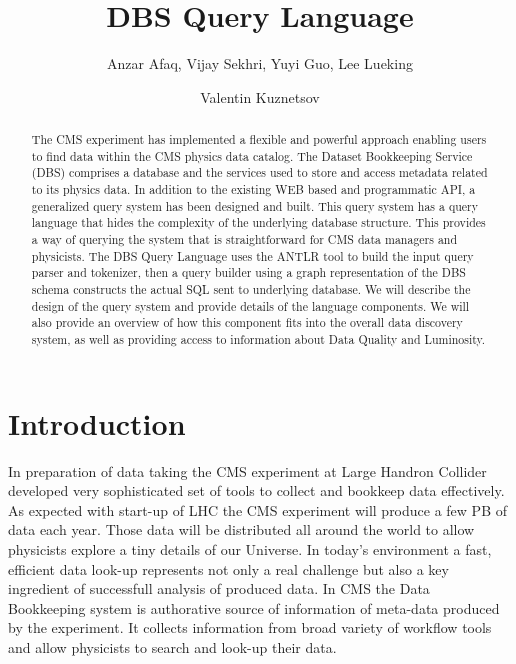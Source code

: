 \documentclass[a4paper]{jpconf}
\begin{document}
\title{DBS Query Language}

\author{Anzar Afaq, Vijay Sekhri, Yuyi Guo, Lee Lueking}
\address{Fermilab, Batavia, Illinois, USA}

\author{Valentin Kuznetsov}
\address{Cornell University, Ithaca, NY 14853, USA}

\begin{abstract}
The CMS experiment has implemented a flexible and 
powerful approach enabling users to find data within 
the CMS physics data catalog. The Dataset Bookkeeping 
Service (DBS) comprises a database and the services 
used to store and access metadata related to its physics 
data. In addition to the existing WEB based and programmatic 
API, a generalized query system has been designed and built. 
This query system has a query language that hides the 
complexity of the underlying database structure. This provides 
a way of querying the system that is straightforward for 
CMS data managers and physicists. The DBS Query Language 
uses the ANTLR tool to build the input query parser and tokenizer, 
then a query builder using a graph representation of the 
DBS schema constructs the actual SQL sent to underlying database. 
We will describe the design of the query system and provide 
details of the language components. We will also provide an 
overview of how this component fits into the overall data 
discovery system, as well as providing access to information 
about Data Quality and Luminosity.
\end{abstract}

\section{Introduction}
In preparation of data taking the CMS experiment at Large
Handron Collider developed very sophisticated set of tools
to collect and bookkeep data effectively. As expected with
start-up of LHC the CMS experiment will produce a few
PB of data each year. Those data will be distributed all
around the world to allow physicists explore a tiny
details of our Universe. In today's environment
a fast, efficient data look-up represents not only a
real challenge but also a key ingredient of successfull
analysis of produced data. In CMS the Data Bookkeeping
system\cite{DBS} is authorative source of information
of meta-data produced by the experiment. It collects
information from broad variety of workflow tools and allow 
physicists to search and look-up their data.
\end{document}
